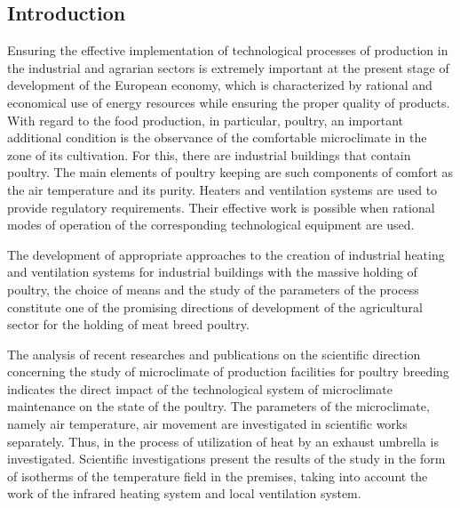 \documentclass[12pt,twoside]{article}
\begin{document}
\begin{JGGarticle}
		\section{Introduction}
			Ensuring the effective implementation of technological processes of production in the industrial and agrarian sectors is extremely important at the present stage of development of the European economy, which is characterized by rational and economical use of energy resources while ensuring the proper quality of products. With regard to the food production, in particular, poultry, an important additional condition is the observance of the comfortable microclimate in the zone of its cultivation. For this, there are industrial buildings that contain poultry. The main elements of poultry keeping are such components of comfort as the air temperature and its purity. Heaters and ventilation systems are used to provide regulatory requirements. Their effective work is possible when rational modes of operation of the corresponding technological equipment are used.
			
			The development of appropriate approaches to the creation of industrial heating and ventilation systems for industrial buildings with the massive holding of poultry, the choice of means and the study of the parameters of the process constitute one of the promising directions of development of the agricultural sector for the holding of meat breed poultry.
			
			The analysis of recent researches and publications on the scientific direction concerning the study of microclimate of production facilities for poultry breeding indicates the direct impact of the technological system of microclimate maintenance on the state of the poultry. The parameters of the microclimate, namely air temperature, air movement are investigated in scientific works \cite{bi:Gumen-Martyn.2017,bi:Yurkevich-Spodyniuk.2015,bi:Petras-Kalus.2000,bi:Spodyniuk-Zhelykh.2010,bi:Gumen-Ljaskovska.2017,bi:Spodyniuk-Zhelykh.2008,bi:Kimball.2005,bi:Shcherbovskykh-Shepitchak.2016,bi:Shepitchak-Zhelykh.2015,bi:Zhelykh-Shepitchak.2015,bi:Zhelykh-Shepitchak.2016,bi:Shepitchak-Spodyniuk.2016,bi:Zhelykh-Kapalo.2008} separately. Thus, in \cite{bi:Spodyniuk-Zhelykh.2010} the process of utilization of heat by an exhaust umbrella is investigated. Scientific investigations \cite{bi:Yurkevich-Spodyniuk.2015,bi:Gumen-Ljaskovska.2017} present the results of the study in the form of isotherms of the temperature field in the premises, taking into account the work of the infrared heating system and local ventilation system.
			

\end{JGGarticle}
\end{document}
